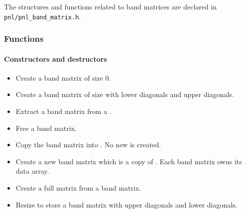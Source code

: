 The structures and functions related to band matrices are declared in
\verb!pnl/pnl_band_matrix.h!. 


\subsubsection{Functions}
\paragraph{Constructors and destructors}
\begin{itemize}
  \item {}
  \sshortdescribe Create a band matrix of size 0.

\item {}
  \sshortdescribe Create a band matrix of size  with  lower
  diagonals and  upper diagonals.

\item {}
  \sshortdescribe Extract a band matrix from a .

\item {}
  \sshortdescribe Free a band matrix.

\item {}
  \sshortdescribe Copy the band matrix  into . No new
   is created.

\item {}
  \sshortdescribe Create a new band matrix which is a copy of . Each
  band matrix owns its data array.

\item {}
  \sshortdescribe Create a full matrix from a band matrix.

\item {}
  \sshortdescribe Resize  to store a  band matrix with
   upper diagonals and  lower diagonals.
\end{itemize}

